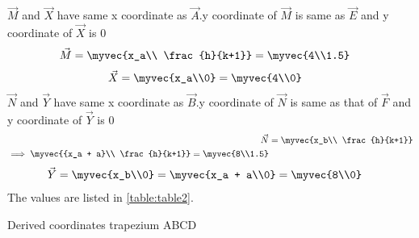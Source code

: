 \begin{enumerate}[label=\thesection.\arabic*.,ref=\thesection.\theenumi]
$\vec{M}$ and $\vec{X}$ have same x coordinate as $\vec{A}$.y coordinate of $\vec{M}$ is same as $\vec{E}$ and y coordinate of $\vec{X}$ is 0
\begin{align}
\vec{M} &= \myvec{x_a\\ \frac{h}{k+1}} = \myvec{4\\1.5}
\label{eq:constr_m}
\end{align}
%
\begin{align}
\vec{X} &= \myvec{x_a\\0} = \myvec{4\\0}
\label{eq:constr_x}
\end{align}
%
$\vec{N}$ and $\vec{Y}$ have same x coordinate as $\vec{B}$.y coordinate of $\vec{N}$ is same as that of $\vec{F}$ and y coordinate of $\vec{Y}$ is 0
\begin{align}
\vec{N} &= \myvec{x_b\\ \frac{h}{k+1}} 
\\
\implies \myvec{{x_a + a}\\ \frac{h}{k+1}} = \myvec{8\\1.5}
\label{eq:constr_n}
\end{align}
%
\begin{align}
\vec{Y} &= \myvec{x_b\\0} =\myvec{x_a + a\\0} =\myvec{8\\0}
\label{eq:constr_y}
\end{align}
The values are listed in \ref{table:table2}. 
%
\begin{table}[ht!]
\centering

\caption{Derived coordinates trapezium ABCD}
\label{table:table2}	
\end{table}
 

\end{enumerate}
